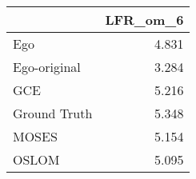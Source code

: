 \begin{tabular}{lr}
\toprule
{} & LFR_om_6 \\
\midrule
Ego          &    4.831 \\
Ego-original &    3.284 \\
GCE          &    5.216 \\
Ground Truth &    5.348 \\
MOSES        &    5.154 \\
OSLOM        &    5.095 \\
\bottomrule
\end{tabular}
